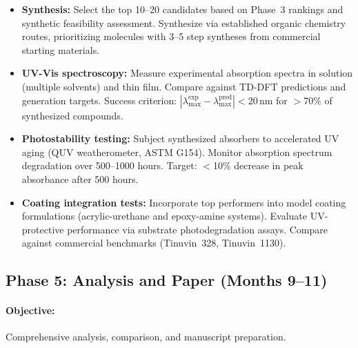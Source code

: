 \documentclass[11pt,a4paper]{article}
\begin{document}
\begin{itemize}[leftmargin=*]
  \item \textbf{Synthesis:} Select the top 10--20 candidates based on Phase~3 rankings
    and synthetic feasibility assessment. Synthesize via established organic chemistry
    routes, prioritizing molecules with 3--5 step syntheses from commercial starting
    materials.

  \item \textbf{UV-Vis spectroscopy:} Measure experimental absorption spectra in
    solution (multiple solvents) and thin film. Compare against TD-DFT predictions
    and generation targets. Success criterion: $|\lambda_\text{max}^\text{exp} -
    \lambda_\text{max}^\text{pred}| < 20$\,nm for $>$70\% of synthesized compounds.

  \item \textbf{Photostability testing:} Subject synthesized absorbers to accelerated
    UV aging (QUV weatherometer, ASTM G154). Monitor absorption spectrum degradation
    over 500--1000 hours. Target: $<$10\% decrease in peak absorbance after 500 hours.

  \item \textbf{Coating integration tests:} Incorporate top performers into model
    coating formulations (acrylic-urethane and epoxy-amine systems). Evaluate
    UV-protective performance via substrate photodegradation assays. Compare
    against commercial benchmarks (Tinuvin~328, Tinuvin~1130).
\end{itemize}

\subsection{Phase 5: Analysis and Paper (Months 9--11)}

\paragraph{Objective:} Comprehensive analysis, comparison, and manuscript preparation.
\end{document}
